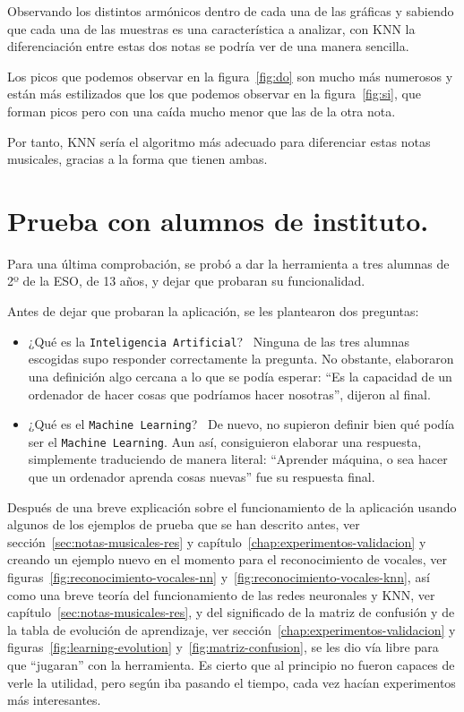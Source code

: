 \documentclass[a4paper, 12pt]{book}
\begin{document}
Observando los distintos armónicos dentro de cada una de las gráficas y sabiendo que cada una de las muestras es una característica a analizar, con KNN la diferenciación entre estas dos notas se podría ver de una manera sencilla.

Los picos que podemos observar en la figura~\ref{fig:do} son mucho más numerosos y están más estilizados que los que podemos observar en la figura~\ref{fig:si}, que forman picos pero con una caída mucho menor que las de la otra nota.

Por tanto, KNN sería el algoritmo más adecuado para diferenciar estas notas musicales, gracias a la forma que tienen ambas.

\section{Prueba con alumnos de instituto.}
\label{sec:prueba}

Para una última comprobación, se probó a dar la herramienta a tres alumnas de 2º de la ESO, de 13 años, y dejar que probaran su funcionalidad.

Antes de dejar que probaran la aplicación, se les plantearon dos preguntas:

\begin{itemize}
	\item ¿Qué es la \texttt{Inteligencia Artificial}?~ Ninguna de las tres alumnas escogidas supo responder correctamente la pregunta. No obstante, elaboraron una definición algo cercana a lo que se podía esperar: ``Es la capacidad de un ordenador de hacer cosas que podríamos hacer nosotras'', dijeron al final.
	\item ¿Qué es el \texttt{Machine Learning}?~ De nuevo, no supieron definir bien qué podía ser el \texttt{Machine Learning}. Aun así, consiguieron elaborar una respuesta, simplemente traduciendo de manera literal: ``Aprender máquina, o sea hacer que un ordenador aprenda cosas nuevas'' fue su respuesta final.
\end{itemize}

Después de una breve explicación sobre el funcionamiento de la aplicación usando algunos de los ejemplos de prueba que se han descrito antes, ver sección~\ref{sec:notas-musicales-res} y capítulo~\ref{chap:experimentos-validacion} y creando un ejemplo nuevo en el momento para el reconocimiento de vocales, ver figuras~\ref{fig:reconocimiento-vocales-nn} y~\ref{fig:reconocimiento-vocales-knn}, así como una breve teoría del funcionamiento de las redes neuronales y KNN, ver capítulo~\ref{sec:notas-musicales-res}, y del significado de la matriz de confusión y de la tabla de evolución de aprendizaje, ver sección~\ref{chap:experimentos-validacion} y figuras~\ref{fig:learning-evolution} y~\ref{fig:matriz-confusion}, se les dio vía libre para que ``jugaran'' con la herramienta. Es cierto que al principio no fueron capaces de verle la utilidad, pero según iba pasando el tiempo, cada vez hacían experimentos más interesantes.
\end{document}
